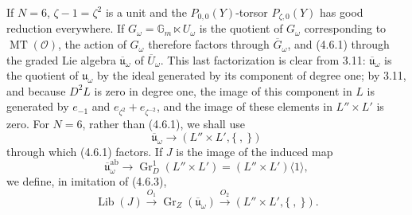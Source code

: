 \documentclass[10pt,a4paper]{article}
\newcommand{\Gm}{\mathbb G_m}
\newcommand{\MT}{\operatorname{MT}}
\newcommand{\Gr}{\operatorname{Gr}}
\newcommand{\OO}{\mathcal O}
\newcommand{\uomega}{\mathfrak u_\omega}
\theoremstyle{deligne}
\newcommand{\heading}[1]{\vspace{0.65em}\noindent{\bfseries #1}\quad}
\begin{document}
\heading{4.7.} If \(N=6\), \(\zeta-1=\zeta^2\) is a unit and the \(P_{0,0}(Y)\)-torsor \(P_{\zeta,0}(Y)\) has good reduction everywhere. If \(G_\omega=\Gm\ltimes U_\omega\) is the quotient of \(G_\omega\) corresponding to \(\MT(\OO)\), the action of \(G_\omega\) therefore factors through \(\overline G_\omega\), and (4.6.1) through the graded Lie algebra \(\overline{\mathfrak u}_\omega\) of \(\overline U_\omega\). This last factorization is clear from 3.11: \(\overline{\mathfrak u}_\omega\) is the quotient of \(\uomega\) by the ideal generated by its component of degree one; by 3.11, and because \(D^2L\) is zero in degree one, the image of this component in \(L\) is generated by \(e_{-1}\) and \(e_{\zeta^2}+e_{\zeta^{-2}}\), and the image of these elements in \(L''\times L'\) is zero. For \(N=6\), rather than (4.6.1), we shall use
\[
\tag{4.7.1}
\overline{\mathfrak u}_\omega\longrightarrow(L''\times L',\{\ ,\ \})
\]
through which (4.6.1) factors. If \(J\) is the image of the induced map
\[
\tag{4.7.2}
\overline{\mathfrak u}_\omega^{\mathrm{ab}}\longrightarrow\Gr_D^1(L''\times L')=(L''\times L')\langle1\rangle,
\]
we define, in imitation of (4.6.3),
\[
\tag{4.7.3}
\operatorname{Lib}(J)\overset{O_1}{\longrightarrow}\Gr_Z(\overline{\mathfrak u}_\omega)
\overset{O_2}{\longrightarrow}(L''\times L',\{\ ,\ \}).
\]
\end{document}
